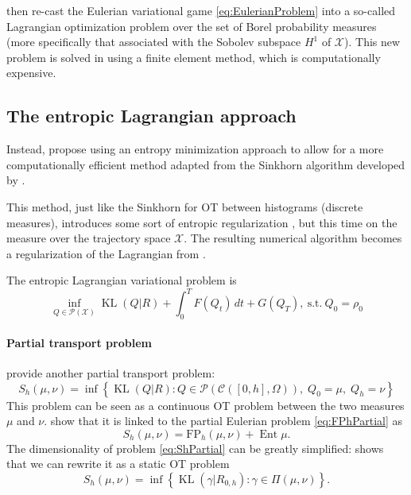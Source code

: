 \documentclass{article}
\newcommand{\calC}{\mathcal{C}}
\newcommand{\calP}{\mathcal{P}}
\newcommand{\calX}{\mathcal{X}}
\newcommand{\suchthat}{\mathrm{s.t.}}
\DeclareMathOperator{\Ent}{Ent}
\DeclareMathOperator{\KL}{KL}
\numberwithin{equation}{section}
\theoremstyle{definition}
\begin{document}
\textcite{benamou:hal-01295299,benamou2015lagrangian} then re-cast the Eulerian variational game \eqref{eq:EulerianProblem} into a so-called Lagrangian optimization problem over the set of Borel probability measures (more specifically that associated with the Sobolev subspace $H^1$ of $\calX$). This new problem is solved in \cite{benamou:hal-01295299} using a finite element method, which is computationally expensive.




\subsection{The entropic Lagrangian approach}

Instead, \textcite{benamou2018entropy} propose using an entropy minimization approach to allow for a more computationally efficient method adapted from the Sinkhorn algorithm \cite{cuturi2013sinkhorn} developed by \citeauthor{cuturi2013sinkhorn}.

This method, just like the Sinkhorn for OT between histograms (discrete measures), introduces some sort of entropic regularization \cite{benamou2018entropy}, but this time on the measure over the trajectory space $\calX$. The resulting numerical algorithm becomes a regularization of the Lagrangian from \cite{benamou:hal-01295299,benamou2015lagrangian}.

The entropic Lagrangian variational problem is
\begin{equation}\label{eq:EntropyLagrangianPb}
\inf_{Q\in\calP(\calX)}
\KL(Q|R) + \int_0^T F(Q_t)\,dt + G(Q_T),\
\suchthat\ Q_0 = \rho_0
\end{equation}

\paragraph{Partial transport problem} \citeauthor{benamou2018entropy} provide another partial transport problem:
\begin{equation}\label{eq:ShPartial}
   	S_h(\mu, \nu) =
   	\inf\left\{
   		\KL(Q|R) : Q\in\calP(\calC([0,h], \Omega)),
   		\; Q_0 = \mu,\; Q_h = \nu
   	\right\}
\end{equation}
This problem can be seen as a continuous OT problem between the two measures $\mu$ and $\nu$. \textcite{benamou2018entropy} show that it is linked to the partial Eulerian problem \eqref{eq:FPhPartial} as
\[
   	S_h(\mu,\nu) = \mathrm{FP}_h(\mu,\nu) + \Ent \mu.
\]
The dimensionality of problem \eqref{eq:ShPartial} can be greatly simplified: \cite{benamou2018entropy} shows that we can rewrite it as a static OT problem
\begin{equation}
   	S_h(\mu, \nu) = \inf\left\{ \KL(\gamma | R_{0,h}) : \gamma \in \Pi(\mu, \nu) \right\}.
\end{equation}
\end{document}
